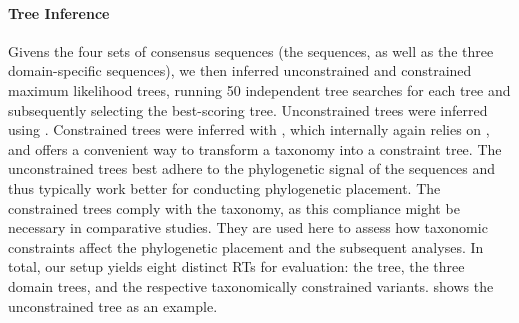 \paragraph{Tree Inference}
\label{ch:AutomaticTrees:sec:Evaluation:sub:ReferenceTreeSetup:par:TreeInference}

Givens the four sets of consensus sequences
(the  sequences, as well as the three domain-specific sequences),
we then inferred unconstrained and constrained maximum likelihood trees,
running 50 independent tree searches for each tree and subsequently selecting the best-scoring tree.
Unconstrained trees were inferred using  \cite{Stamatakis2014}.
Constrained trees were inferred with  \cite{Kozlov2016},
which internally again relies on ,
and offers a convenient way to transform a taxonomy into a constraint tree.
The unconstrained trees best adhere to the phylogenetic signal of the sequences
and thus typically work better for conducting phylogenetic placement.
The constrained trees comply with the  taxonomy,
as this compliance might be necessary in comparative studies.
They are used here to assess how taxonomic constraints affect the phylogenetic placement and the subsequent analyses.
In total, our setup yields eight distinct \acp{RT} for evaluation:
the  tree, the three domain trees, and the respective taxonomically constrained variants.
 shows the unconstrained  tree as an example.

